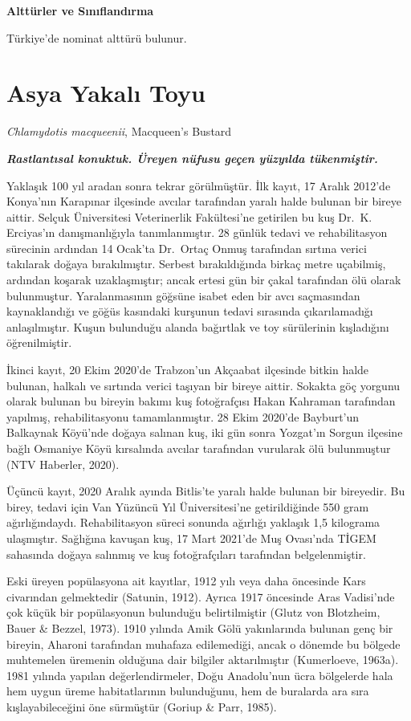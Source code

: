 \documentclass[
  a4paper,
  DIV=11,
  numbers=noendperiod]{scrreprt}
\begin{document}
\textbf{Alttürler ve Sınıflandırma}

Türkiye'de nominat alttürü bulunur.

\section{Asya Yakalı Toyu}\label{asya-yakalux131-toyu}

\emph{Chlamydotis macqueenii}, Macqueen's Bustard

\textbf{\emph{Rastlantısal konuktuk. Üreyen nüfusu geçen yüzyılda
tükenmiştir.}}

Yaklaşık 100 yıl aradan sonra tekrar görülmüştür. İlk kayıt, 17 Aralık
2012'de Konya'nın Karapınar ilçesinde avcılar tarafından yaralı halde
bulunan bir bireye aittir. Selçuk Üniversitesi Veterinerlik Fakültesi'ne
getirilen bu kuş Dr.~K. Erciyas'ın danışmanlığıyla tanımlanmıştır. 28
günlük tedavi ve rehabilitasyon sürecinin ardından 14 Ocak'ta Dr.~Ortaç
Onmuş tarafından sırtına verici takılarak doğaya bırakılmıştır. Serbest
bırakıldığında birkaç metre uçabilmiş, ardından koşarak uzaklaşmıştır;
ancak ertesi gün bir çakal tarafından ölü olarak bulunmuştur.
Yaralanmasının göğsüne isabet eden bir avcı saçmasından kaynaklandığı ve
göğüs kasındaki kurşunun tedavi sırasında çıkarılamadığı anlaşılmıştır.
Kuşun bulunduğu alanda bağırtlak ve toy sürülerinin kışladığını
öğrenilmiştir.

İkinci kayıt, 20 Ekim 2020'de Trabzon'un Akçaabat ilçesinde bitkin halde
bulunan, halkalı ve sırtında verici taşıyan bir bireye aittir. Sokakta
göç yorgunu olarak bulunan bu bireyin bakımı kuş fotoğrafçısı Hakan
Kahraman tarafından yapılmış, rehabilitasyonu tamamlanmıştır. 28 Ekim
2020'de Bayburt'un Balkaynak Köyü'nde doğaya salınan kuş, iki gün sonra
Yozgat'ın Sorgun ilçesine bağlı Osmaniye Köyü kırsalında avcılar
tarafından vurularak ölü bulunmuştur (NTV Haberler, 2020).

Üçüncü kayıt, 2020 Aralık ayında Bitlis'te yaralı halde bulunan bir
bireyedir. Bu birey, tedavi için Van Yüzüncü Yıl Üniversitesi'ne
getirildiğinde 550 gram ağırlığındaydı. Rehabilitasyon süreci sonunda
ağırlığı yaklaşık 1,5 kilograma ulaşmıştır. Sağlığına kavuşan kuş, 17
Mart 2021'de Muş Ovası'nda TİGEM sahasında doğaya salınmış ve kuş
fotoğrafçıları tarafından belgelenmiştir.

Eski üreyen popülasyona ait kayıtlar, 1912 yılı veya daha öncesinde Kars
civarından gelmektedir (Satunin, 1912). Ayrıca 1917 öncesinde Aras
Vadisi'nde çok küçük bir popülasyonun bulunduğu belirtilmiştir (Glutz
von Blotzheim, Bauer \& Bezzel, 1973). 1910 yılında Amik Gölü
yakınlarında bulunan genç bir bireyin, Aharoni tarafından muhafaza
edilemediği, ancak o dönemde bu bölgede muhtemelen üremenin olduğuna
dair bilgiler aktarılmıştır (Kumerloeve, 1963a). 1981 yılında yapılan
değerlendirmeler, Doğu Anadolu'nun ücra bölgelerde hala hem uygun üreme
habitatlarının bulunduğunu, hem de buralarda ara sıra kışlayabileceğini
öne sürmüştür (Goriup \& Parr, 1985).
\end{document}
